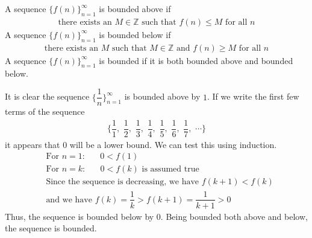 \begin{definition}
A sequence $\{f(n)\}_{n=1}^{\infty}$ is bounded above if
\begin{align*}
    \text{there exists an} \hspace{4pt} M \in \mathbb{Z} \hspace{4pt} \text{such that} \hspace{4pt} f(n) \leq M \hspace{4pt} \text{for all} \hspace{4pt} n
\end{align*}
A sequence $\{f(n)\}_{n=1}^{\infty}$ is bounded below if
\begin{align*}
    \text{there exists an} \hspace{4pt} M \hspace{4pt} \text{such that} \hspace{4pt} M \in \mathbb{Z} \hspace{4pt} \text{and} \hspace{4pt} f(n) \geq M \hspace{4pt} \text{for all} \hspace{4pt} n
\end{align*}
A sequence $\{f(n)\}_{n=1}^{\infty}$ is bounded if it is both bounded above and bounded below.
\end{definition}

\begin{example}
It is clear the sequence $\Big\{\dfrac{1}{n}\Big\}_{n=1}^{\infty}$ is bounded above by $1$. If we write the first few terms of the sequence
\begin{align*}
    \Big\{\dfrac{1}{1}, \hspace{4pt} \dfrac{1}{2}, \hspace{4pt} \dfrac{1}{3}, \hspace{4pt} \dfrac{1}{4}, \hspace{4pt} \dfrac{1}{5}, \hspace{4pt} \dfrac{1}{6}, \hspace{4pt} \dfrac{1}{7}, \hspace{4pt} \cdots \Big\}
\end{align*}
it appears that $0$ will be a lower bound. We can test this using induction.
\begin{align*}
    &\text{For} \hspace{4pt} n=1: \hspace{20pt} 0 < f(1)\\[2ex]
    &\text{For} \hspace{4pt} n=k: \hspace{20pt} 0 < f(k) \hspace{4pt} \text{is assumed true}\\[2ex]
    &\text{Since the sequence is decreasing, we have} \hspace{4pt} f(k+1) < f(k)\\[2ex]
    &\text{and we have} \hspace{4pt} f(k) = \dfrac{1}{k} > f(k+1) = \dfrac{1}{k+1} > 0 
\end{align*}
Thus, the sequence is bounded below by $0$. Being bounded both above and below, the sequence is bounded.
\end{example}

